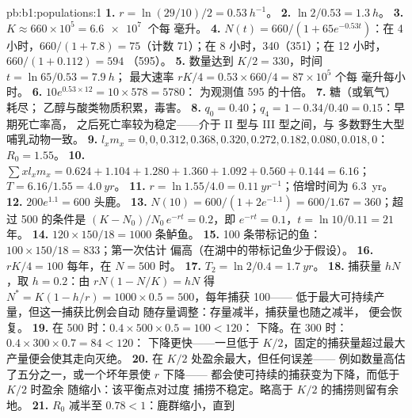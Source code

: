 \begin{solution}{pb:b1:populations:1}
\textbf{1.} $r = \ln(29/10)/2 = \qty{0.53}{h^{-1}}$。
\textbf{2.} $\ln 2/0.53 = \qty{1.3}{h}$。
\textbf{3.} $K \approx 660\times 10^5 = \qty{6.6e7}{}$ 个每
毫升。
\textbf{4.} $N(t) = 660/(1 + 65e^{-0.53t})$：在 4 小时，$660/(1 + 7.8) =
75$（计数 71）；在 8 小时，340（351）；在 12 小时，$660/(1 + 0.112) = 594$
（595）。
\textbf{5.} 数量达到 $K/2 = 330$，时间 $t = \ln 65/0.53 = \qty{7.9}{h}$；
最大速率 $rK/4 = 0.53\times 660/4 = 87\times 10^5$ 个每
毫升每小时。
\textbf{6.} $10e^{0.53\times 12} = 10\times 578 = 5780$：
为观测值 595 的十倍。
\textbf{7.} 糖（或氧气）耗尽；
乙醇与酸类物质积累，毒害。
\textbf{8.} $q_0 = 0.40$；$q_4 = 1 - 0.34/0.40 = 0.15$：早期死亡率高，
之后死亡率较为稳定——介于 II 型与 III 型之间，与
多数野生大型哺乳动物一致。
\textbf{9.} $l_x m_x = 0, 0, 0.312, 0.368, 0.320, 0.272, 0.182, 0.080,
0.018, 0$：$R_0 = 1.55$。
\textbf{10.} $\sum x l_x m_x = 0.624 + 1.104 + 1.280 + 1.360 + 1.092 +
0.560 + 0.144 = 6.16$；$T = 6.16/1.55 = \qty{4.0}{yr}$。
\textbf{11.} $r = \ln 1.55/4.0 = \qty{0.11}{yr^{-1}}$；倍增时间为
\qty{6.3}{yr}。
\textbf{12.} $200e^{1.1} = 600$ 头鹿。
\textbf{13.} $N(10) = 600/(1 + 2e^{-1.1}) = 600/1.67 = 360$；超过 500
的条件是 $(K - N_0)/N_0\,e^{-rt} = 0.2$，即 $e^{-rt} = 0.1$，$t = \ln
10/0.11 = 21$ 年。
\textbf{14.} $120\times 150/18 = 1000$ 条鲈鱼。
\textbf{15.} 100 条带标记的鱼：$100\times 150/18 = 833$；第一次估计
偏高（在湖中的带标记鱼少于假设）。
\textbf{16.} $rK/4 = 100$ 每年，在 $N = 500$ 时。
\textbf{17.} $T_2 = \ln 2/0.4 = \qty{1.7}{yr}$。
\textbf{18.} 捕获量 $hN$，取 $h = 0.2$：由 $rN(1 - N/K) = hN$ 得 $N^* =
K(1 - h/r) = 1000\times 0.5 = 500$，每年捕获 \num{100}——
低于最大可持续产量，但这一捕获比例会自动
随存量调整：存量减半，捕获量也随之减半，
便会恢复。
\textbf{19.} 在 500 时：$0.4\times 500\times 0.5 = 100 < 120$：
下降。在 300 时：$0.4\times 300\times 0.7 = 84 < 120$：
下降更快——一旦低于 $K/2$，固定的捕获量超过最大
产量便会使其走向灭绝。
\textbf{20.} 在 $K/2$ 处盈余最大，但任何误差——
例如数量高估了五分之一，或一个坏年景使 $r$ 下降——
都会使可持续的捕获变为下降，而低于 $K/2$ 时盈余
随缩小：该平衡点对过度
捕捞不稳定。略高于 $K/2$ 的捕捞则留有余地。
\textbf{21.} $R_0$ 减半至 $0.78 < 1$：鹿群缩小，直到

\end{solution}
